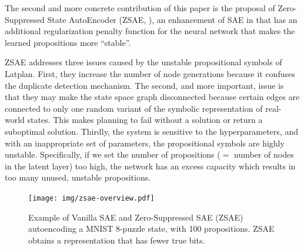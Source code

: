 The second and more concrete contribution of this paper is
the proposal of Zero-Suppressed State AutoEncoder (ZSAE, ), an enhancement of SAE in \latentplanner
that has an additional regularization penalty function for the neural network 
that makes the learned propositions more ``stable''.

ZSAE addresses three issues caused by the unstable propositional symbols of Latplan.
First, they increase the number of node generations because it confuses the duplicate detection mechanism.
The second, and more important, issue is that they may make the state space graph disconnected because certain edges
are connected to only one random variant of the symbolic representation of real-world states.
This makes planning to fail without a solution or return a suboptimal solution.
Thirdly, the system is sensitive to the hyperparameters, and with an inappropriate set of parameters,
the propositional symbols are highly unstable.
Specifically, if we set the number of propositions ($=$ number of nodes in the latent layer) too high, the network
has an excess capacity which results in too many unused, unstable propositions.

\begin{figure}[htb]
 \centering
 \texttt{[image: img/zsae-overview.pdf]}
 \caption{
Example of Vanilla SAE and Zero-Suppressed SAE (ZSAE) autoencoding a MNIST 8-puzzle state, with 100 propositions.
ZSAE obtains a representation that has fewer true bits.}
 \label{zsae-overview}
\end{figure}


% 

